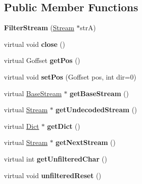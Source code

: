 \subsection*{Public Member Functions}
\begin{DoxyCompactItemize}
\item 
\mbox{\label{class_filter_stream_a46b5c4157e6e19f0512d3be29999e0ca}} 
{\bfseries Filter\+Stream} (\hyperlink{class_stream}{Stream} $\ast$strA)
\item 
\mbox{\label{class_filter_stream_a6f21f95a918cc1cc4ee1bde2c6880bbe}} 
virtual void {\bfseries close} ()
\item 
\mbox{\label{class_filter_stream_ac0c36832172f3917e7414b6858a68166}} 
virtual Goffset {\bfseries get\+Pos} ()
\item 
\mbox{\label{class_filter_stream_a4bf99e6fc0c574085fcec70e66ca9519}} 
virtual void {\bfseries set\+Pos} (Goffset pos, int dir=0)
\item 
\mbox{\label{class_filter_stream_ac00f3d76345df9ac2cff4e63bfe1a61d}} 
virtual \hyperlink{class_base_stream}{Base\+Stream} $\ast$ {\bfseries get\+Base\+Stream} ()
\item 
\mbox{\label{class_filter_stream_a6c3355b0174699fac6bc01f59baba51a}} 
virtual \hyperlink{class_stream}{Stream} $\ast$ {\bfseries get\+Undecoded\+Stream} ()
\item 
\mbox{\label{class_filter_stream_ae095d36efcebce6f1b16f403013f4f4b}} 
virtual \hyperlink{class_dict}{Dict} $\ast$ {\bfseries get\+Dict} ()
\item 
\mbox{\label{class_filter_stream_a3ac0c47f4191e0ccf74fe4fb4a1b08d1}} 
virtual \hyperlink{class_stream}{Stream} $\ast$ {\bfseries get\+Next\+Stream} ()
\item 
\mbox{\label{class_filter_stream_a56c7c67d2f21ceefdb363cf91ce64cc9}} 
virtual int {\bfseries get\+Unfiltered\+Char} ()
\item 
\mbox{\label{class_filter_stream_a628962756a7611adb89c6c9e5144f066}} 
virtual void {\bfseries unfiltered\+Reset} ()
\end{DoxyCompactItemize}
